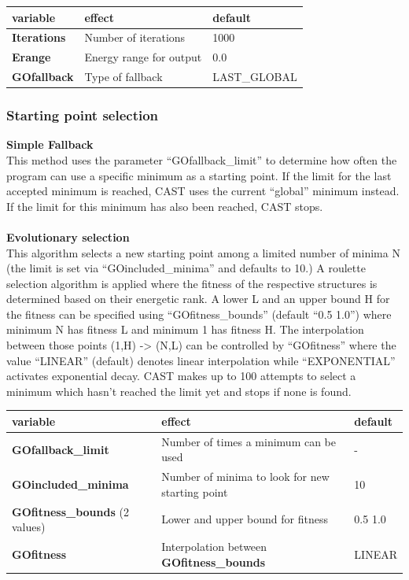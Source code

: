 \documentclass[10pt,a4paper]{article} %
\begin{document}
	\begin{tabularx}{\textwidth}{l|X|X}
	variable & effect & default \\
	\hline
	\textbf{Iterations} & Number of iterations & 1000 \\
	\textbf{Erange} & Energy range for output & 0.0 \\
		\textbf{GOfallback} & Type of fallback & LAST\_GLOBAL \\
	\end{tabularx}
	
	\subsubsection{Starting point selection}
	\textbf{Simple Fallback} \\
	This method uses the parameter ``GOfallback\_limit'' to determine how often the program can use a specific minimum as a starting point. If the limit for the last accepted minimum is reached, \ac{CAST} uses the current ``global'' minimum instead. If the limit for this minimum has also been reached, \ac{CAST} stops.\\~\\
		
	\textbf{Evolutionary selection} \\
	This algorithm selects a new starting point among a limited number of minima N (the limit is set via ``GOincluded\_minima'' and defaults to 10.)
	A roulette selection algorithm is applied where the fitness of the respective structures is determined based on their energetic rank. A lower L and an upper bound H for the fitness can be specified using ``GOfitness\_bounds'' (default ``0.5 1.0'') where minimum N has fitness L and minimum 1 has fitness H.
	The interpolation between those points (1,H) -> (N,L) can be controlled by ``GOfitness'' where the value ``LINEAR'' (default) denotes linear interpolation while ``EXPONENTIAL'' activates exponential decay.
	\ac{CAST} makes up to 100 attempts to select a minimum which hasn't reached the limit yet and stops if none is found.
	
	\begin{tabularx}{\textwidth}{l|X|X}
	variable & effect & default \\
		\hline
		\textbf{GOfallback\_limit} & Number of times a minimum can be used & - \\
		\textbf{GOincluded\_minima} & Number of minima to look for new starting point & 10 \\
		\textbf{GOfitness\_bounds} (2 values) & Lower and upper bound for fitness & 0.5 1.0 \\
		\textbf{GOfitness} & Interpolation between \textbf{GOfitness\_bounds} & LINEAR \\
	\end{tabularx}
	\\~\\
\end{document}
